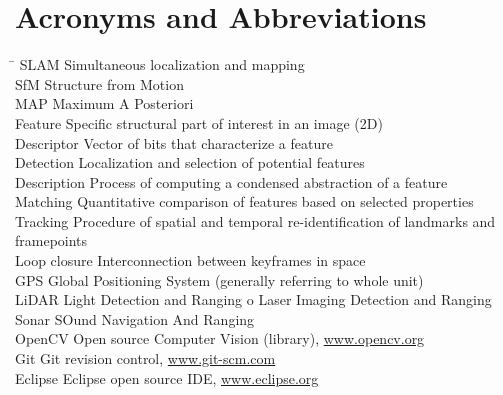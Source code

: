\section*{Acronyms and Abbreviations}
\label{sec:acronyms}
\begin{tabbing}
	\hspace*{3.5cm}		\= \kill
	SLAM \> Simultaneous localization and mapping \\[1ex]
    SfM \> Structure from Motion \\[1ex]
    MAP \> Maximum A Posteriori \\[1ex]
	Feature \> Specific structural part of interest in an image (2D) \\[1ex]
	Descriptor \> Vector of bits that characterize a feature \\[1ex]
	Detection \> Localization and selection of potential features \\[1ex]
	Description \> Process of computing a condensed abstraction of a feature \\[1ex]
	Matching \> Quantitative comparison of features based on selected properties \\[1ex]
	Tracking \> Procedure of spatial and temporal re-identification of landmarks and framepoints \\[1ex]
	Loop closure \> Interconnection between keyframes in space \\[1ex]
	GPS \> Global Positioning System (generally referring to whole unit) \\[1ex]
    LiDAR \> Light Detection and Ranging o Laser Imaging Detection and Ranging \\[1ex]
    Sonar \> SOund Navigation And Ranging \\[1ex]
	OpenCV  \> Open source Computer Vision (library), \url{www.opencv.org} \\[1ex]
	Git  \> Git revision control, \url{www.git-scm.com} \\[1ex]
	Eclipse \> Eclipse open source IDE, \url{www.eclipse.org}
\end{tabbing}